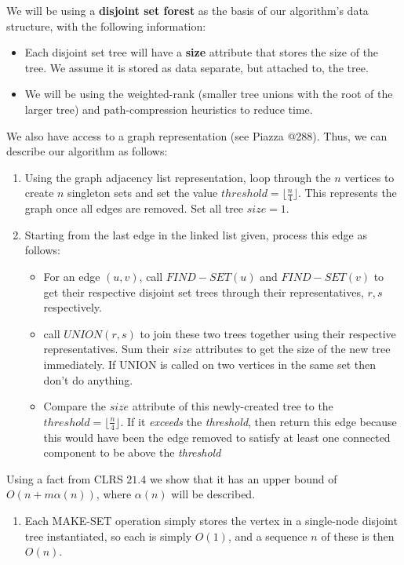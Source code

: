 \documentclass[11pt]{article}
\begin{document}
\begin{solution}
\vspace{5 mm}
\noindent
We will be using a \textbf{disjoint set forest} as the basis of our algorithm's data structure, with the following information:
\begin{itemize}
    \item Each disjoint set tree will have a \textbf{size} attribute that stores the size of the tree. We assume it is stored as data separate, but attached to, the tree.
    \item We will be using the weighted-rank (smaller tree unions with the root of the larger tree) and path-compression heuristics to reduce time.
\end{itemize}
We also have access to a graph representation (see Piazza @288). Thus, we can describe our algorithm as follows:
\begin{enumerate}
    \item Using the graph adjacency list representation, loop through the $n$ vertices to create $n$ singleton sets and set the value $threshold = \lfloor \frac{n}{4} \rfloor$. This represents the graph once all edges are removed. Set all tree $size = 1$.
    \item Starting from the last edge in the linked list given, process this edge as follows:
    \begin{itemize}
        \item For an edge $(u,v)$, call $FIND-SET(u)$ and $FIND-SET(v)$ to get their respective disjoint set trees through their representatives, $r, s$ respectively.
        \item call $UNION(r, s)$ to join these two trees together using their respective representatives. Sum their $size$ attributes to get the size of the new tree immediately. If UNION is called on two vertices in the same set then don't do anything.
        \item Compare the $size$ attribute of this newly-created tree to the $threshold = \lfloor \frac{n}{4} \rfloor$. If it \textit{exceeds} the \textit{threshold}, then return this edge because this would have been the edge removed to satisfy at least one connected component to be above the \textit{threshold}
    \end{itemize}
\end{enumerate}
Using a fact from CLRS $ 21.4$ we show that it has an upper bound of $O(n + m \alpha(n))$, where $\alpha(n)$ will be described.
\begin{enumerate}
  \item Each MAKE-SET operation simply stores the vertex in a single-node disjoint tree instantiated, so each is simply $O(1)$, and a sequence $n$ of these is then $O(n)$.

\end{enumerate}
\end{solution}
\end{document}
